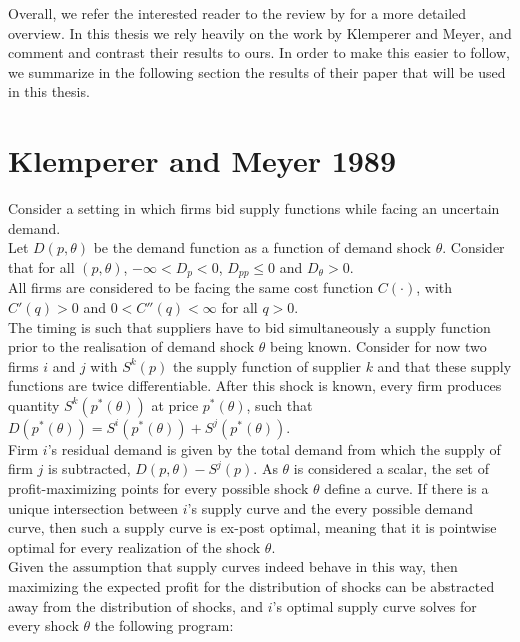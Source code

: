 Overall, we refer the interested reader to the review by \cite{ventosa2005electricity} for a more detailed overview. In this thesis we rely heavily on the work by Klemperer and Meyer, and comment and contrast their results to ours. In order to make this easier to follow, we summarize in the following section the results of their paper that will be used in this thesis.

\section*{Klemperer and Meyer 1989}
Consider a setting in which firms bid supply functions while facing an uncertain demand. \\

Let $D(p,\theta)$ be the demand function as a function of demand shock $\theta$. Consider that for all $(p,\theta)$, $-\infty<D_p<0$, $D_{pp}\leq 0$ and $D_\theta>0$.\\

All firms are considered to be facing the same cost function $C(\cdot)$, with $C'(q)>0$ and $0<C''(q)<\infty$ for all $q>0$.\\

The timing is such that suppliers have to bid simultaneously a supply function prior to the realisation of demand shock $\theta$ being known. Consider for now two firms $i$ and $j$ with $S^k(p)$ the supply function of supplier $k$ and that these supply functions are twice differentiable. After this shock is known, every firm produces quantity $S^k(p^*(\theta))$ at price $p^*(\theta)$, such that $D(p^*(\theta)) = S^i(p^*(\theta)) + S^j(p^*(\theta))$.\\

Firm $i$'s residual demand is given by the total demand from which the supply of firm $j$ is subtracted, $D(p,\theta) - S^j(p)$. As $\theta$ is considered a scalar, the set of profit-maximizing points for every possible shock $\theta$ define a curve. If there is a unique intersection between $i$'s supply curve and the every possible demand curve, then such a supply curve is ex-post optimal, meaning that it is pointwise optimal for every realization of the shock $\theta$. \\

Given the assumption that supply curves indeed behave in this way, then maximizing the expected profit for the distribution of shocks can be abstracted away from the distribution of shocks, and $i$'s optimal supply curve solves for every shock $\theta$ the following program:


